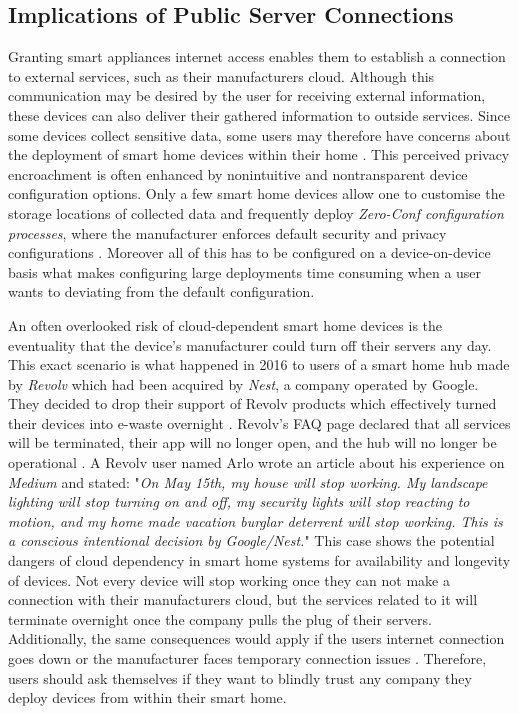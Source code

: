 \subsection{Implications of Public Server Connections}
Granting smart appliances internet access enables them to establish a connection to external services, such as their manufacturers cloud. Although this communication may be desired by the user for receiving external information, these devices can also deliver their gathered information to outside services. Since some devices collect sensitive data, some users may therefore have concerns about the deployment of smart home devices within their home \cite{ImprovingPrivacyControl-8514198}. This perceived privacy encroachment is often enhanced by nonintuitive and nontransparent device configuration options. Only a few smart home devices allow one to customise the storage locations of collected data and frequently deploy \textit{Zero-Conf configuration processes}, where the manufacturer enforces default security and privacy configurations \cite{ImprovingPrivacyControl-8514198}. Moreover all of this has to be configured on a device-on-device basis what makes configuring large deployments time consuming when a user wants to deviating from the default configuration.

An often overlooked risk of cloud-dependent smart home devices is the eventuality that the device's manufacturer could turn off their servers any day. This exact scenario is what happened in 2016 to users of a smart home hub made by \textit{Revolv} which had been acquired by \textit{Nest}, a company operated by Google. They decided to drop their support of Revolv products which effectively turned their devices into e-waste overnight \cite{Proctor2020BH}. Revolv's FAQ page declared that all services will be terminated, their app will no longer open, and the hub will no longer be operational \cite{Gilbert2016Nest}. A Revolv user named Arlo wrote an article about his experience on \textit{Medium} and stated: "\textit{On May 15th, my house will stop working. My landscape lighting will stop turning on and off, my security lights will stop reacting to motion, and my home made vacation burglar deterrent will stop working. This is a conscious intentional decision by Google/Nest.}" \cite{Gilbert2016Nest} \newline
This case shows the potential dangers of cloud dependency in smart home systems for availability and longevity of devices. Not every device will stop working once they can not make a connection with their manufacturers cloud, but the services related to it will terminate overnight once the company pulls the plug of their servers. Additionally, the same consequences would apply if the users internet connection goes down or the manufacturer faces temporary connection issues \cite{BertkoChris2017HSH:}. Therefore, users should ask themselves if they want to blindly trust any company they deploy devices from within their smart home.

